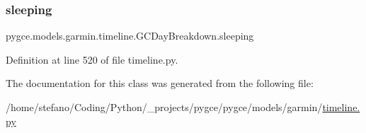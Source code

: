 \subsubsection{\texorpdfstring{sleeping}{sleeping}}
{\footnotesize\ttfamily pygce.\+models.\+garmin.\+timeline.\+G\+C\+Day\+Breakdown.\+sleeping}



Definition at line 520 of file timeline.\+py.



The documentation for this class was generated from the following file\+:\begin{DoxyCompactItemize}
\item 
/home/stefano/\+Coding/\+Python/\+\_\+projects/pygce/pygce/models/garmin/\hyperlink{timeline_8py}{timeline.\+py}\end{DoxyCompactItemize}
